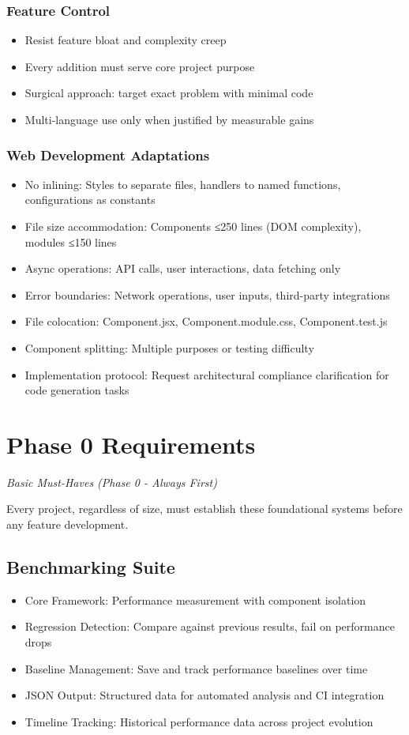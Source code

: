 \documentclass{article}
\begin{document}
\subsubsection{Feature Control}
\begin{itemize}[noitemsep]
\item Resist feature bloat and complexity creep
\item Every addition must serve core project purpose
\item Surgical approach: target exact problem with minimal code
\item Multi-language use only when justified by measurable gains
\end{itemize}

\subsubsection{Web Development Adaptations}
\begin{itemize}[noitemsep]
\item No inlining: Styles to separate files, handlers to named functions, configurations as constants
\item File size accommodation: Components ≤250 lines (DOM complexity), modules ≤150 lines
\item Async operations: API calls, user interactions, data fetching only
\item Error boundaries: Network operations, user inputs, third-party integrations
\item File colocation: Component.jsx, Component.module.css, Component.test.js
\item Component splitting: Multiple purposes or testing difficulty
\item Implementation protocol: Request architectural compliance clarification for code generation tasks
\end{itemize}

\section{Phase 0 Requirements}
\textit{Basic Must-Haves (Phase 0 - Always First)}

Every project, regardless of size, must establish these foundational systems before any feature development.

\subsection{Benchmarking Suite}
\begin{itemize}[noitemsep]
\item Core Framework: Performance measurement with component isolation
\item Regression Detection: Compare against previous results, fail on performance drops
\item Baseline Management: Save and track performance baselines over time
\item JSON Output: Structured data for automated analysis and CI integration
\item Timeline Tracking: Historical performance data across project evolution
\end{itemize}
\end{document}
